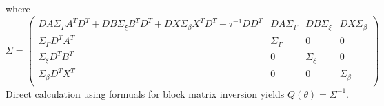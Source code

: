 \documentclass[]{article}
\begin{document}
where
\begin{equation*}
\Sigma = \begin{pmatrix}
DA\Sigma_{\Gamma}A^{T}D^{T} + DB\Sigma_{\xi}B^{T}D^{T} + DX\Sigma_{\beta}X^{T}D^{T} + \tau^{-1}DD^{T} & DA\Sigma_{\Gamma} & DB\Sigma_{\xi} & DX\Sigma_{\beta} \\
\Sigma_{\Gamma}D^{T}A^{T} & \Sigma_{\Gamma} & 0 & 0 \\
\Sigma_{\xi}D^{T}B^{T} & 0 & \Sigma_{\xi} & 0 \\
\Sigma_{\beta}D^{T}X^{T} & 0 & 0 & \Sigma_{\beta} \\
\end{pmatrix}
\end{equation*}
Direct calculation using formuals for block matrix inversion yields $Q(\theta) = \Sigma^{-1}$.
\end{document}

